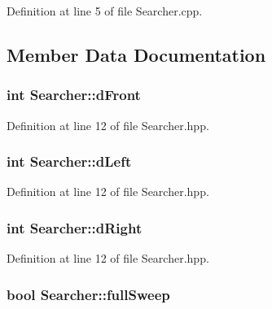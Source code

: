 Definition at line 5 of file Searcher.\-cpp.



\subsection{Member Data Documentation}
\hypertarget{classSearcher_ae9ecf25b0705199abad716431659d4b6}{
\subsubsection[{d\-Front}]{\setlength{\rightskip}{0pt plus 5cm}int Searcher\-::d\-Front\hspace{0.3cm}{\ttfamily [private]}}}\label{classSearcher_ae9ecf25b0705199abad716431659d4b6}


Definition at line 12 of file Searcher.\-hpp.

\hypertarget{classSearcher_afa55bd372a5cb9cdebc9720dfe098e4d}{
\subsubsection[{d\-Left}]{\setlength{\rightskip}{0pt plus 5cm}int Searcher\-::d\-Left\hspace{0.3cm}{\ttfamily [private]}}}\label{classSearcher_afa55bd372a5cb9cdebc9720dfe098e4d}


Definition at line 12 of file Searcher.\-hpp.

\hypertarget{classSearcher_a56c7e8eb20ba293376d59dc55ac4a0c5}{
\subsubsection[{d\-Right}]{\setlength{\rightskip}{0pt plus 5cm}int Searcher\-::d\-Right\hspace{0.3cm}{\ttfamily [private]}}}\label{classSearcher_a56c7e8eb20ba293376d59dc55ac4a0c5}


Definition at line 12 of file Searcher.\-hpp.

\hypertarget{classSearcher_a34cdc6cbf4aa91ade07e1b9e5aa362fb}{
\subsubsection[{full\-Sweep}]{\setlength{\rightskip}{0pt plus 5cm}bool Searcher\-::full\-Sweep\hspace{0.3cm}{\ttfamily [private]}}}\label{classSearcher_a34cdc6cbf4aa91ade07e1b9e5aa362fb}


